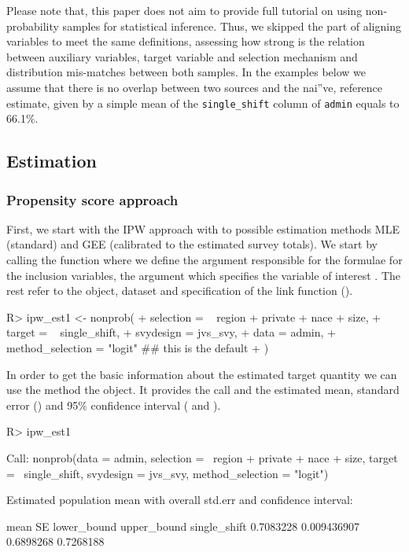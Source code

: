 \documentclass[
]{jss}
\begin{document}
Please note that, this paper does not aim to provide full tutorial on
using non-probability samples for statistical inference. Thus, we
skipped the part of aligning variables to meet the same definitions,
assessing how strong is the relation between auxiliary variables, target
variable and selection mechanism and distribution mis-matches between
both samples. In the examples below we assume that there is no overlap
between two sources and the nai''ve, reference estimate, given by a
simple mean of the \texttt{single\_shift} column of \texttt{admin}
equals to 66.1\%.

\subsection{Estimation}\label{estimation}

\subsubsection{Propensity score
approach}\label{propensity-score-approach}

First, we start with the IPW approach with to possible estimation
methods MLE (standard) and GEE (calibrated to the estimated survey
totals). We start by calling the  function where we define
the  argument responsible for the formulae for the
inclusion variables, the  argument which specifies the
variable of interest . The rest refer to the
 object, dataset and specification of the link function
().

\begin{CodeChunk}
\begin{CodeInput}
R> ipw_est1 <- nonprob(
+   selection = ~ region + private + nace + size,
+   target = ~ single_shift,
+   svydesign = jvs_svy,
+   data = admin,
+   method_selection = "logit" ## this is the default
+ )
\end{CodeInput}
\end{CodeChunk}

In order to get the basic information about the estimated target
quantity we can use the  method the object. It provides the
call and the estimated mean, standard error () and 95\%
confidence interval ( and ).

\begin{CodeChunk}
\begin{CodeInput}
R> ipw_est1
\end{CodeInput}
\begin{CodeOutput}

Call:
nonprob(data = admin, selection = ~region + private + nace + 
    size, target = ~single_shift, svydesign = jvs_svy, method_selection = "logit")

Estimated population mean with overall std.err and confidence interval:

                  mean          SE lower_bound upper_bound
single_shift 0.7083228 0.009436907   0.6898268   0.7268188
\end{CodeOutput}
\end{CodeChunk}
\end{document}
